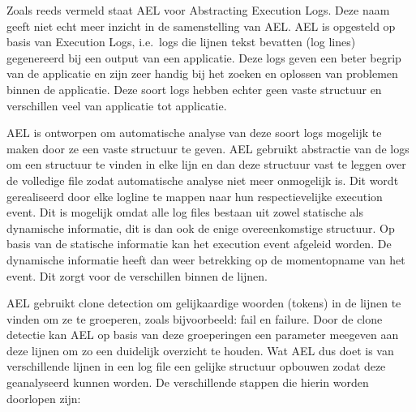 Zoals reeds vermeld staat AEL voor Abstracting Execution Logs. Deze naam geeft niet echt meer inzicht in de samenstelling van AEL. AEL is opgesteld op basis van Execution Logs, i.e.\ logs die lijnen tekst bevatten (log lines) gegenereerd bij een output van een applicatie. Deze logs geven een beter begrip van de applicatie en zijn zeer handig bij het zoeken en oplossen van problemen binnen de applicatie. Deze soort logs hebben echter geen vaste structuur en verschillen veel van applicatie tot applicatie.

AEL is ontworpen om automatische analyse van deze soort logs mogelijk te maken door ze een vaste structuur te geven. AEL gebruikt abstractie van de logs om een structuur te vinden in elke lijn en dan deze structuur vast te leggen over de volledige file zodat automatische analyse niet meer onmogelijk is. Dit wordt gerealiseerd door elke logline te mappen naar hun respectievelijke execution event. Dit is mogelijk omdat alle log files bestaan uit zowel statische als dynamische informatie, dit is dan ook de enige overeenkomstige structuur. Op basis van de statische informatie kan het execution event afgeleid worden. De dynamische informatie heeft dan weer betrekking op de momentopname van het event. Dit zorgt voor de verschillen binnen de lijnen. 

AEL gebruikt clone detection om gelijkaardige woorden (tokens) in de lijnen te vinden om ze te groeperen, zoals bijvoorbeeld: fail en failure. Door de clone detectie kan AEL op basis van deze groeperingen een parameter meegeven aan deze lijnen om zo een duidelijk overzicht te houden. Wat AEL dus doet is van verschillende lijnen in een log file een gelijke structuur opbouwen zodat deze geanalyseerd kunnen worden. De verschillende stappen die hierin worden doorlopen zijn:

